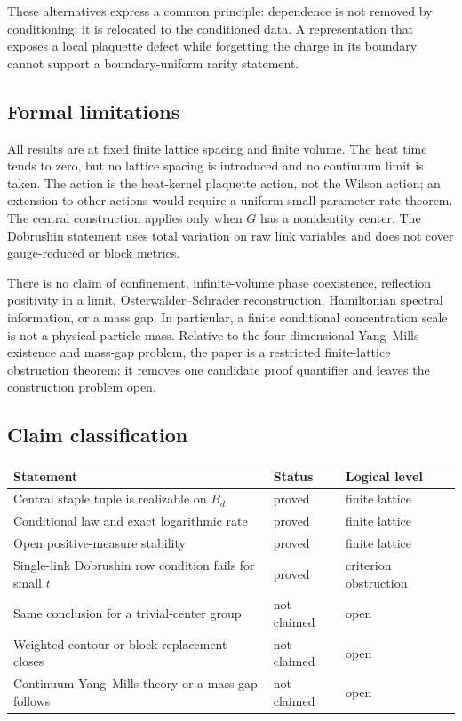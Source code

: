 These alternatives express a common principle: dependence is not removed by
conditioning; it is relocated to the conditioned data.  A representation
that exposes a local plaquette defect while forgetting the charge in its
boundary cannot support a boundary-uniform rarity statement.

\subsection{Formal limitations}

All results are at fixed finite lattice spacing and finite volume.  The heat
time tends to zero, but no lattice spacing is introduced and no continuum
limit is taken.  The action is the heat-kernel plaquette action, not the
Wilson action; an extension to other actions would require a uniform
small-parameter rate theorem.  The central construction applies only when
$G$ has a nonidentity center.  The Dobrushin statement uses total variation
on raw link variables and does not cover gauge-reduced or block metrics.

There is no claim of confinement, infinite-volume phase coexistence,
reflection positivity in a limit, Osterwalder--Schrader reconstruction,
Hamiltonian spectral information, or a mass gap.  In particular, a finite
conditional concentration scale is not a physical particle mass.  Relative
to the four-dimensional Yang--Mills existence and mass-gap problem, the
paper is a restricted finite-lattice obstruction theorem: it removes one
candidate proof quantifier and leaves the construction problem open.

\subsection{Claim classification}

\begin{center}
\begin{tabular}{@{}p{}p{}p{}@{}}
\toprule
Statement & Status & Logical level \\
\midrule
Central staple tuple is realizable on $B_d$ & proved & finite lattice \\
Conditional law and exact logarithmic rate & proved & finite lattice \\
Open positive-measure stability & proved & finite lattice \\
Single-link Dobrushin row condition fails for small $t$ & proved & criterion obstruction \\
Same conclusion for a trivial-center group & not claimed & open \\
Weighted contour or block replacement closes & not claimed & open \\
Continuum Yang--Mills theory or a mass gap follows & not claimed & open \\
\bottomrule
\end{tabular}
\end{center}
